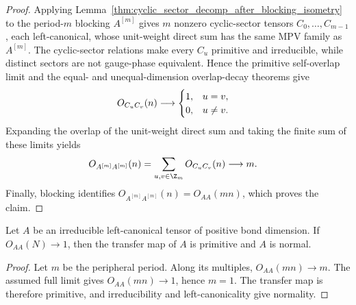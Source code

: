 \begin{proof}
    \leanok
    Applying
    Lemma~\ref{thm:cyclic_sector_decomp_after_blocking_isometry} to the
    period-$m$ blocking $A^{[m]}$ gives $m$ nonzero cyclic-sector
    tensors $C_0,\ldots,C_{m-1}$, each left-canonical, whose unit-weight direct
    sum has the same MPV family as $A^{[m]}$. The cyclic-sector relations make
    every $C_u$ primitive and irreducible, while distinct sectors are not
    gauge-phase equivalent. Hence the primitive self-overlap limit and the
    equal- and unequal-dimension overlap-decay theorems give
    \begin{align}
        O_{C_uC_v}(n)
         & \longrightarrow
        \begin{cases}
            1, & u=v,     \\
            0, & u\neq v.
        \end{cases}
        \notag
    \end{align}
    Expanding the overlap of the unit-weight direct sum and taking the finite
    sum of these limits yields
    \begin{align}
        O_{A^{[m]}A^{[m]}}(n)
         & =\sum_{u,v\in\Z_m}O_{C_uC_v}(n)
        \longrightarrow m.
        \notag
    \end{align}
    Finally, blocking identifies
    $O_{A^{[m]}A^{[m]}}(n)=O_{AA}(mn)$, which proves the claim.
\end{proof}

\begin{lemma}
    \label{thm:bnt_primitivity_normality_from_self_overlap}
    \leanok
    Let $A$ be an irreducible left-canonical tensor of positive bond dimension.
    If $O_{AA}(N)\longrightarrow1$, then the transfer map of $A$ is primitive
    and $A$ is normal.
\end{lemma}

\begin{proof}
    \leanok
    Let $m$ be the peripheral period. Along its multiples,
    $O_{AA}(mn)\longrightarrow m$. The assumed full limit gives
    $O_{AA}(mn)\to1$, hence $m=1$. The transfer map is therefore primitive,
    and irreducibility and left-canonicality give normality.
\end{proof}

